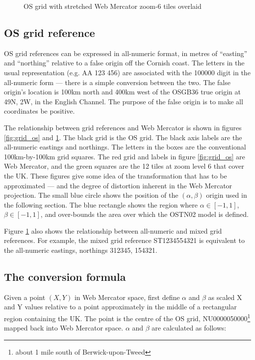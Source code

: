 \documentclass[10pt,a4paper]{article}
\begin{document}
\begin{figure}[t]
  \centering
  \fbox{
    
  }
  \caption{OS grid with stretched Web Mercator zoom-6 tiles overlaid}
  \label{fig:grid_wm}
\end{figure}


\subsection {OS grid reference}
OS grid references can be expressed in all-numeric format, in metres of
``easting'' and ``northing'' relative to a false origin off the Cornish coast.
The letters in the usual representation (e.g. AA 123 456) are associated with
the 100000 digit in the all-numeric form --- there is a simple conversion
between the two.  The false origin's location is 100km north and 400km west of
the OSGB36 true origin at 49N, 2W, in the English Channel.  The purpose of the
false origin is to make all coordinates be positive.

The relationship between grid references and Web Mercator is shown in figures
\ref{fig:grid_os} and \ref{fig:grid_wm}.  The black grid is the OS grid.  The
black axis labels are the all-numeric eastings and northings. The letters in
the boxes are the conventional 100km-by-100km grid squares.  The red grid and
labels in figure \ref{fig:grid_os} are Web Mercator, and the green squares are
the 12 tiles at zoom level 6 that cover the UK.  These figures give some idea
of the transformation that has to be approximated --- and the degree of
distortion inherent in the Web Mercator projection.  The small blue circle
shows the position of the $(\alpha,\beta)$ origin used in the following
section.  The blue rectangle shows the region where $\alpha \in [-1,1]$, $\beta
\in [-1,1]$, and over-bounds the area over which the OSTN02 model is defined.

Figure \ref{fig:grid_wm} also shows the relationship between all-numeric and
mixed grid references.  For example, the mixed grid reference ST1234554321 is
equivalent to the all-numeric eastings, northings 312345, 154321.


\subsection {The conversion formula}
Given a point $(X,Y)$ in Web Mercator space, first define $\alpha$ and $\beta$
as scaled X and Y values relative to a point approximately in the middle of a
rectangular region containing the UK.  The point is the centre of the OS grid,
NU0000050000\footnote{about 1 mile south of Berwick-upon-Tweed} mapped back
into Web Mercator space.  $\alpha$ and $\beta$ are calculated as follows:
\end{document}
